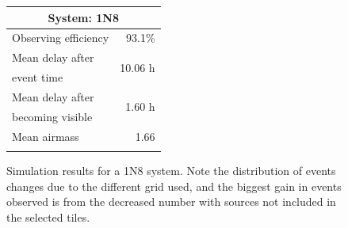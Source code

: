 \begin{colsection}
\begin{colsection}
\begin{figure}[p]
\begin{center}
    \begin{minipage}[t]{0.35\textwidth}\vspace{0pt}
    \begin{tabular}{lr}
    \multicolumn{2}{c}{\textbf{System: 1N8}} \\
    \midrule
    Observing efficiency & 93.1\% \\
    \midrule
    Mean delay after     & \multirow{2}{*}{10.06 h} \\
    event time           & \\
    Mean delay after     & \multirow{2}{*}{1.60 h} \\
    becoming visible     & \\
    \midrule
    Mean airmass         & 1.66 \\
    & \\
    \end{tabular}
    \vfill
    \end{minipage}

    \end{center}
    \caption[GW simulation results: 1N8 system]{
        Simulation results for a 1N8 system. Note the distribution of events changes due to the different grid used, and the biggest gain in events observed is from the decreased number with sources not included in the selected tiles.
    }\label{fig:gw_sim_1n8}
\end{figure}


\begin{figure}[p]
    \begin{center}


\end{center}
\end{figure}
\end{colsection}
\end{colsection}
